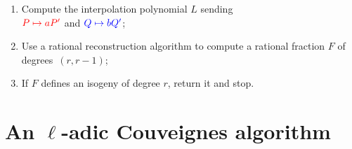 \documentclass[10pt]{beamer}
\theoremstyle{plain}
\theoremstyle{definition}
\theoremstyle{definition}
\theoremstyle{definition}
\theoremstyle{definition}
\theoremstyle{remark}
\theoremstyle{remark}
\begin{document}
\begin{frame}
\begin{enumerate}
\begin{enumerate}
    \item Compute the interpolation polynomial
      $L$ sending\\
      $\color{red}P\mapsto aP'$ and $\color{blue}Q\mapsto bQ'$;
      \hfill{}
    \item Use a  rational reconstruction  algorithm 
      to compute a rational
      fraction $F$ of degrees~$(r, r-1)$;
      \hfill{}
    \item If $F$ defines an isogeny of degree $r$, return it and
      stop.
    \end{enumerate}
  \end{enumerate}
\end{frame}


\begin{frame}
  \begin{center}
    \Huge 



  \end{center}
\end{frame}

\section{An $\ell$-adic Couveignes algorithm}
\end{document}
